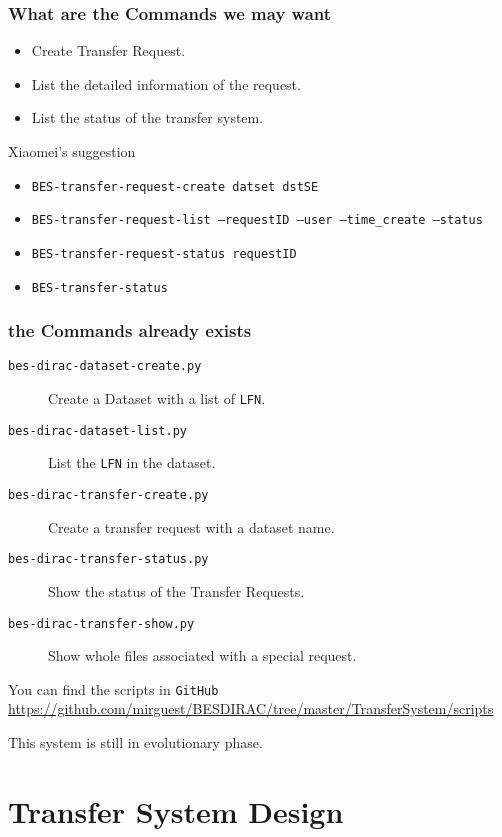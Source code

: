 \documentclass[19pt]{beamer}
\begin{document}
\begin{frame}
    \frametitle{What are the Commands we may want}
    \begin{itemize}
        \item Create Transfer Request.
        \item List the detailed information of the request.
        \item List the status of the transfer system.
    \end{itemize}
    \begin{exampleblock}{Xiaomei's suggestion}
        \begin{itemize}
            \item {\tt BES-transfer-request-create datset dstSE}
            \item {\tt BES-transfer-request-list --requestID --user
                        --time\_create --status}
            \item {\tt BES-transfer-request-status requestID}
            \item {\tt BES-transfer-status}
        \end{itemize}
    \end{exampleblock}
\end{frame}

\begin{frame}
    \frametitle{the Commands already exists}
    \begin{description}
        \item[{\tt bes-dirac-dataset-create.py}]
            Create a Dataset with a list of {\tt LFN}.
        \item[{\tt bes-dirac-dataset-list.py}]
            List the {\tt LFN} in the dataset.
        \item[{\tt bes-dirac-transfer-create.py}]
            Create a transfer request with a dataset name.
        \item[{\tt bes-dirac-transfer-status.py}]
            Show the status of the Transfer Requests.
        \item[{\tt bes-dirac-transfer-show.py}]
            Show whole files associated with a special request.
    \end{description}
    \begin{block}{You can find the scripts in {\tt GitHub}}
        \url{https://github.com/mirguest/BESDIRAC/tree/master/TransferSystem/scripts}

        This system is still in evolutionary phase.
    \end{block}
\end{frame}

\section{Transfer System Design}

    
\end{document}
